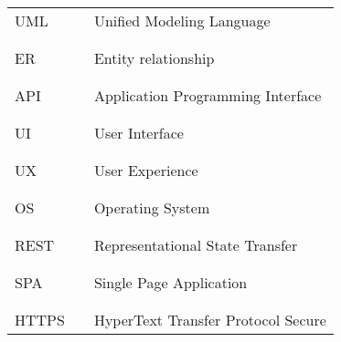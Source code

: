 \begin{table}[H]
\begin{tabular}{l l p{11cm}}
        UML               & \vline & Unified Modeling Language                              \\
                          &        &                                                        \\\hline \\
        ER                & \vline & Entity relationship                                    \\
                          &        &                                                        \\\hline \\
        API               & \vline & Application Programming Interface                      \\
                          &        &                                                        \\\hline \\
        UI                & \vline & User Interface                                         \\
                          &        &                                                        \\\hline \\
        UX                & \vline & User Experience                                        \\
                          &        &                                                        \\\hline \\
        OS                & \vline & Operating System                                       \\
                          &        &                                                        \\\hline \\
        REST              & \vline & Representational State Transfer                        \\
                          &        &                                                        \\\hline \\
        SPA               & \vline & Single Page Application                                \\  
                          &        &                                                        \\\hline \\
        HTTPS             & \vline & HyperText Transfer Protocol Secure                     \\

\end{tabular}
\end{table}
